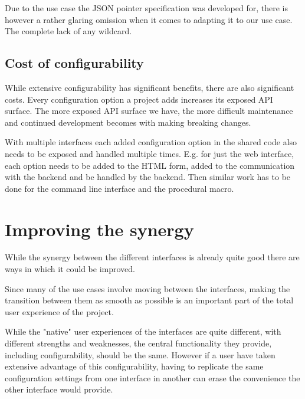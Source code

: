 Due to the use case the JSON pointer specification was developed for, there is however a rather glaring omission when it comes to adapting it to our use case. The complete lack of any wildcard.


\subsection{Cost of configurability}

While extensive configurability has significant benefits, there are also significant costs. Every configuration option a project adds increases its exposed API surface. The more exposed API surface we have, the more difficult maintenance and continued development becomes with making breaking changes.

With multiple interfaces each added configuration option in the shared code also needs to be exposed and handled multiple times. E.g. for just the web interface, each option needs to be added to the HTML form, added to the communication with the backend and be handled by the backend. Then similar work has to be done for the command line interface and the procedural macro.



\section{Improving the synergy}
\label{sec:improving-synergy}

While the synergy between the different interfaces is already quite good there are ways in which it could be improved.

Since many of the use cases involve moving between the interfaces, making the transition between them as smooth as possible is an important part of the total user experience of the project.

While the "native" user experiences of the interfaces are quite different, with different strengths and weaknesses, the central functionality they provide, including configurability, should be the same. However if a user have taken extensive advantage of this configurability, having to replicate the same configuration settings from one interface in another can erase the convenience the other interface would provide.


